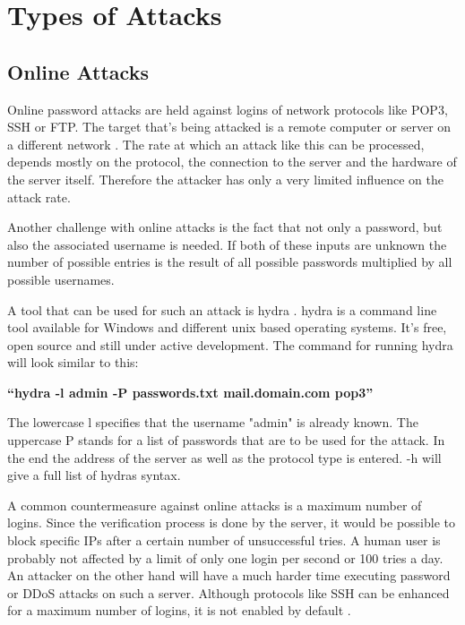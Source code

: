 \section{Types of Attacks}

\subsection{Online Attacks}

Online password attacks are held against logins of network protocols like POP3, SSH or FTP. The target that's being attacked is a remote computer or server on a different network \cite{pentesting}. The rate at which an attack like this can be processed, depends mostly on the protocol, the connection to the server and the hardware of the server itself. Therefore the attacker has only a very limited influence on the attack rate.

Another challenge with online attacks is the fact that not only a password, but also the associated username is needed. If both of these inputs are unknown the number of possible entries is the result of all possible passwords multiplied by all possible usernames.

A tool that can be used for such an attack is hydra \cite{hydra}. hydra is a command line tool available for Windows and different unix based operating systems. It's free, open source and still under active development. The command for running hydra will look similar to this:

\begin{center}
\textbf{``hydra -l admin -P passwords.txt mail.domain.com pop3''}
\end{center}

The lowercase l specifies that the username "admin" is already known. The uppercase P stands for a list of passwords that are to be used for the attack. In the end the address of the server as well as the protocol type is entered. -h will give a full list of hydras syntax.

A common countermeasure against online attacks is a maximum number of logins. Since the verification process is done by the server, it would be possible to block specific IPs after a certain number of unsuccessful tries. A human user is probably not affected by a limit of only one login per second or 100 tries a day. An attacker on the other hand will have a much harder time executing password or DDoS attacks on such a server. Although protocols like SSH can be enhanced for a maximum number of logins, it is not enabled by default \cite{sshmanpages}.

